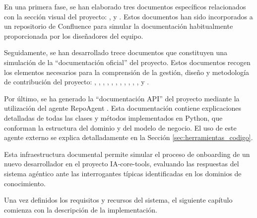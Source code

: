 En una primera fase, se han elaborado tres documentos específicos relacionados con la sección visual del proyecto: ,  y . Estos documentos han sido incorporados a un repositorio de Confluence para simular la documentación habitualmente proporcionada por los diseñadores del equipo.

Seguidamente, se han desarrollado trece documentos que constituyen una simulación de la ``documentación oficial'' del proyecto. Estos documentos recogen los elementos necesarios para la comprensión de la gestión, diseño y metodología de contribución del proyecto: , , , , , , , , , , ,  y .

Por último, se ha generado la ``documentación API'' del proyecto mediante la utilización del agente RepoAgent \cite{luo_repoagent_2024}. Esta documentación contiene explicaciones detalladas de todas las clases y métodos implementados en Python, que conforman la estructura  del dominio y del modelo de negocio. El uso de este agente externo se explica detalladamente en la Sección \ref{sec:herramientas_codigo}.

Esta infraestructura documental permite simular el proceso de onboarding de un nuevo desarrollador en el proyecto IA-core-tools, evaluando las respuestas del sistema agéntico ante las interrogantes típicas identificadas en los dominios de conocimiento.

Una vez definidos los requisitos y recursos del sistema, el siguiente capítulo comienza con la descripción de la implementación.







